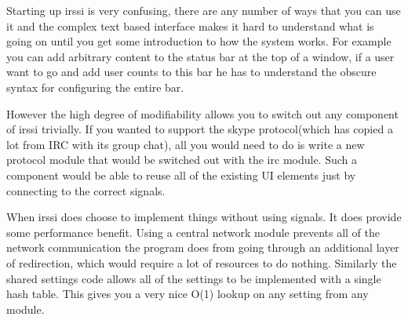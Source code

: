 \documentclass{acm_proc_article-sp}
\begin{document}
Starting up irssi is very confusing, there are any number of ways that you can use it and the complex text based interface makes it hard to understand what is going on until you get some introduction to how the system works. For example you can add arbitrary content to the status bar at the top of a window, if a user want to go and add user counts to this bar he has to understand the obscure syntax for configuring the entire bar.

However the high degree of modifiability allows you to switch out any component of irssi trivially. If you wanted to support the skype protocol(which has copied a lot from IRC with its group chat), all you would need to do is write a new protocol module that would be switched out with the irc module. Such a component would be able to reuse all of the existing UI elements just by connecting to the correct signals.

When irssi does choose to implement things without using signals. It does provide some performance benefit. Using a central network module prevents all of the network communication the program does from going through an additional layer of redirection, which would require a lot of resources to do nothing. Similarly the shared settings code allows all of the settings to be implemented with a single hash table. This gives you a very nice O(1) lookup on any setting from any module.

\nocite{*}
\balancecolumns
\end{document}
